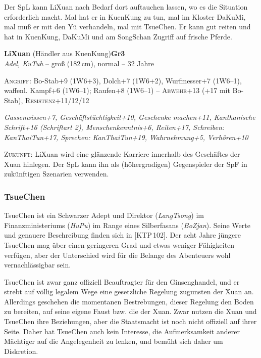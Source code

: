 \documentclass[
a4paper,
twoside,
DIV=calc,
BCOR=4mm,
fontsize=9pt,
twocolumn=on,
titlepage=on,
parskip=half
]{scrartcl}
\begin{document}
Der SpL kann LiXuan nach Bedarf dort auftauchen lassen, wo es die
Situation erforderlich macht. Mal hat er in KuenKung zu tun, mal im
Kloster DaKuMi, mal muß er mit den Yü verhandeln, mal mit TsueChen. Er
kann gut reiten und hat in KuenKung, DaKuMi und am SongSchan Zugriff
auf frische Pferde.

\textbf{LiXuan} (Händler aus KuenKung)\hfill \textbf{Gr3}\\
\emph{Adel, KuTuh} -- groß (182\,cm), normal -- 32 Jahre


\textsc{Angriff:} Bo-Stab+9 (1W6+3), Dolch+7 (1W6+2), Wurfmesser+7
(1W6--1), waffenl. Kampf+6 (1W6--1); Raufen+8 (1W6--1) --
\textsc{Abwehr}+13 (+17 mit Bo-Stab),
\textsc{Resistenz}+11/12/12

\emph{Gassenwissen+7, Geschäftstüchtigkeit+10, Geschenke machen+11,
  Kanthanische Schrift+16 (Schriftart 2), Menschenkenntnis+6,
  Reiten+17, Schreiben: KanThaiTun+17, Sprechen: KanThaiTun+19,
  Wahrnehmung+5, Verhören+10}

\textsc{Zukunft:} LiXuan wird eine glänzende Karriere innerhalb des
Geschäftes der Xuan hinlegen. Der SpL kann ihn als (höhergradigen)
Gegenspieler der SpF in zukünftigen Szenarien verwenden.

\subsubsection{TsueChen}

TsueChen ist ein Schwarzer Adept und Direktor (\emph{LangTsong}) im
Finanzministeriums (\emph{HuPu}) im Range eines Silberfasans
(\emph{BoZjan}). Seine Werte und genauere Beschreibung finden sich in
[KTP\,102]. Der acht Jahre jüngere TsueChen mag über einen geringeren
Grad und etwas weniger Fähigkeiten verfügen, aber der Unterschied wird
für die Belange des Abenteuers wohl vernachlässigbar sein.

TsueChen ist zwar ganz offiziell Beauftragter für den Ginsenghandel,
und er strebt auf völlig legalem Wege eine gesetzliche Regelung
zugunsten der Xuan an. Allerdings geschehen die momentanen Bestrebungen, dieser
Regelung den Boden zu bereiten, auf seine eigene Faust bzw. die der
Xuan. Zwar nutzen die Xuan und TsueChen ihre Beziehungen, aber die
Staatsmacht ist noch nicht offiziell auf ihrer Seite. Daher hat
TsueChen auch kein Interesse, die Aufmerksamkeit anderer Mächtiger auf die
Angelegenheit zu lenken, und bemüht sich daher um Diskretion.
\end{document}
